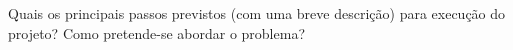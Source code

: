 Quais os principais passos previstos (com uma breve descrição)
para execução do projeto? Como pretende-se abordar o problema?